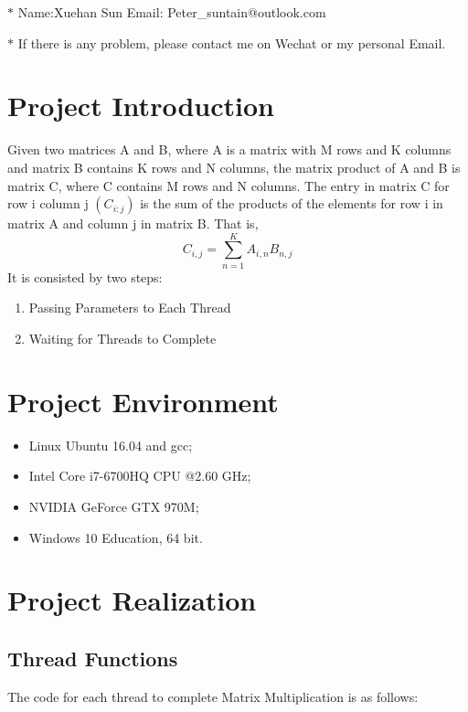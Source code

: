\documentclass[12pt,a4paper]{article}
\begin{document}
\noindent{}
\begin{center}

	\footnotesize{\color{blue}$*$ Name:Xuehan Sun \quad \quad Email: Peter\_suntain@outlook.com}

	\footnotesize{\color{red}$*$ If there is any problem, please contact me on Wechat or my personal Email. }
\end{center}

\tableofcontents
\newpage

\section{Project Introduction}
Given two matrices A and B, where A is a matrix with M rows and K columns and matrix B contains K rows and N columns, the matrix product of A and B is matrix C, where C contains M rows and N columns. The entry in matrix C for row i column j $(C_{i:j})$ is the sum of the products of the elements for row i in matrix A and column j in matrix B. That is,
$$C_{i,j}=\sum\limits_{n=1}^{K}A_{i,n}B_{n,j}$$
It is consisted by two steps:
\begin{enumerate}
	\item  Passing Parameters to Each Thread
	\item  Waiting for Threads to Complete
\end{enumerate}

\section{Project Environment}
\begin{itemize}
	\item  Linux Ubuntu 16.04 and gcc;
	\item  Intel Core i7-6700HQ CPU @2.60 GHz;
	\item  NVIDIA GeForce GTX 970M;
	\item  Windows 10 Education, 64 bit.
\end{itemize}

\section{Project Realization}
\subsection{Thread Functions}
The code for each thread to complete Matrix Multiplication is as follows:
\end{document}
